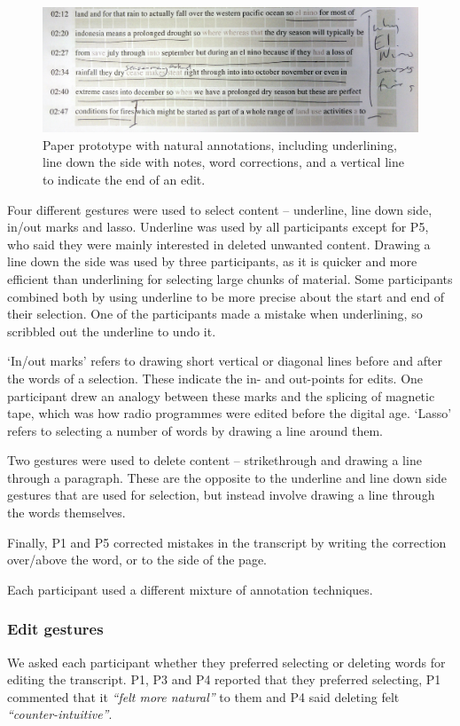 \begin{figure}[h]
  \centering
  \includegraphics[width=\columnwidth]{figs/mockup-cropped}
  \caption{Paper prototype with natural annotations, including
    underlining, line down the side with notes, word corrections, and a
  vertical line to indicate the end of an edit.}
  \label{fig:natural}
\end{figure}

Four different gestures were used to select content -- underline, line down side, in/out marks and lasso.  Underline
was used by all participants except for P5, who said they were mainly interested in deleted unwanted content.  Drawing
a line down the side was used by three participants, as it is quicker and more efficient than underlining for selecting
large chunks of material.  Some participants combined both by using underline to be more precise about the start and
end of their selection.  One of the participants made a mistake when underlining, so scribbled out the underline to
undo it.

`In/out marks' refers to drawing short vertical or diagonal lines before and after the words of a selection. These
indicate the in- and out-points for edits. One participant drew an analogy between these marks and the splicing of
magnetic tape, which was how radio programmes were edited before the digital age. `Lasso' refers to selecting a number
of words by drawing a line around them.

Two gestures were used to delete content -- strikethrough and drawing a line through a paragraph. These are the
opposite to the underline and line down side gestures that are used for selection, but instead involve drawing a line
through the words themselves.

Finally, P1 and P5 corrected mistakes in the transcript by writing the correction over/above the
word, or to the side of the page.

Each participant used a different mixture of annotation techniques.

\subsubsection{Edit gestures}\label{sec:paper-proto-edit-gestures}
We asked each participant whether they preferred selecting or deleting words for editing the transcript.  P1, P3 and P4
reported that they preferred selecting, P1 commented that it \textit{``felt more natural''} to them and P4 said
deleting felt \textit{``counter-intuitive''}.

